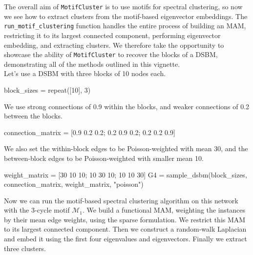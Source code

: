 \documentclass{article}
\begin{document}
The overall aim of \texttt{MotifCluster} is to use motifs for spectral clustering,
so now we see how to extract clusters from the motif-based
eigenvector embeddings.
The \texttt{run\_motif\_clustering} function handles the entire process of
building an MAM, restricting it to its largest connected component,
performing eigenvector embedding, and extracting clusters.
We therefore take the opportunity to showcase the ability of
\texttt{MotifCluster} to recover the blocks of a DSBM,
demonstrating all of the methods outlined in this vignette.\\

Let's use a DSBM with three blocks of 10 nodes each.

\begin{tcolorbox}[colback=black!5!white,colframe=black!15!white]
\begin{juliablock}
block_sizes = repeat([10], 3)
\end{juliablock}
\end{tcolorbox}

We use strong connections of 0.9 within the blocks,
and weaker connections of 0.2 between the blocks.

\begin{tcolorbox}[colback=black!5!white,colframe=black!15!white]
\begin{juliablock}
connection_matrix = [0.9 0.2 0.2; 0.2 0.9 0.2; 0.2 0.2 0.9]
\end{juliablock}
\end{tcolorbox}

We also set the within-block edges to be Poisson-weighted with
mean 30,
and the between-block edges to be Poisson-weighted with smaller
mean 10.

\begin{tcolorbox}[colback=black!5!white,colframe=black!15!white]
\begin{juliablock}
weight_matrix = [30 10 10; 10 30 10; 10 10 30]
G4 = sample_dsbm(block_sizes, connection_matrix, weight_matrix, "poisson")
\end{juliablock}
\end{tcolorbox}

Now we can run the motif-based spectral clustering algorithm
on this network with the 3-cycle motif $\mathcal{M}_1$.
We build a functional MAM,
weighting the instances by their mean edge weights,
using the sparse formulation.
We restrict this MAM to its largest connected component.
Then we construct a random-walk Laplacian and embed it using the
first four eigenvalues and eigenvectors.
Finally we extract three clusters.
\end{document}
